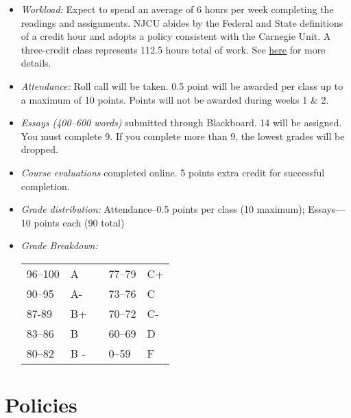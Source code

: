 \documentclass[article,oneside]{memoir}
\begin{document}
\begin{itemize}
\item \textit{Workload:} Expect to spend an average of 6 hours per week completing the readings and assignments. NJCU abides by the Federal and State definitions of a credit hour and adopts a policy consistent with the Carnegie Unit. A three-credit class represents 112.5 hours total of work. See \href{http://scoconno.github.io/Teaching/Credit.pdf}{here} for more details.

\item \textit{Attendance:} Roll call will be taken. 0.5 point will be awarded per class up to a maximum of 10 points. Points will not be awarded during weeks 1 \& 2. 


\item \textit{Essays (400--600 words)} submitted through Blackboard.  14 will be assigned. You must complete 9. If you complete more than 9, the lowest grades will be dropped. 


\item \textit{Course evaluations} completed online. 5 points extra credit for successful completion.
  
\item \textit{Grade distribution:} Attendance--0.5 points per class (10 maximum);  Essays---10 points each (90 total)

\item \textit{Grade Breakdown:}

 \begin{tabular}{ | l | l | p{2cm} | l | l | }
    \hline 
96--100 & A  & &  77--79 &  C+ \\  
90--95 & A- & &  73--76 & C \\
87-89 & B+ &  &  70--72 & C- \\ 
83--86 & B  & &  60--69 & D\\
80--82 & B - & & 0--59 & F\\ \hline
    \end{tabular}


\end{itemize}


\section{Policies}
\end{document}
